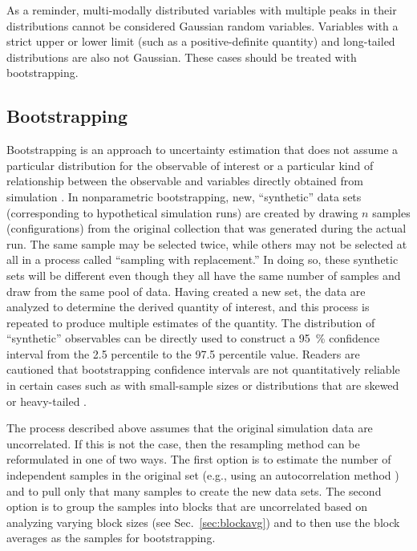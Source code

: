 As a reminder, multi-modally distributed variables with multiple peaks in their distributions cannot be considered Gaussian random variables.  Variables with a strict upper or lower limit (such as a positive-definite quantity) and long-tailed distributions are also not Gaussian.  These cases should be treated with bootstrapping.

\subsection{Bootstrapping}\label{sec:bootstrap}

Bootstrapping is an approach to uncertainty estimation that does not assume a particular distribution for the observable of interest or a particular kind of relationship between the observable and variables directly obtained from simulation \cite{Tibshirani1998}.  In nonparametric bootstrapping, new, ``synthetic'' data sets (corresponding to hypothetical simulation runs) are created by drawing $n$ samples (configurations) from the original collection that was generated during the actual run.  The same sample may be selected twice, while others may not be selected at all in a process called ``sampling with replacement.''  In doing so, these synthetic sets will be different even though they all have the same number of samples and draw from the same pool of data.  Having created a new set, the data are analyzed to determine the derived quantity of interest, and this process is repeated to produce multiple estimates of the quantity.  The distribution of ``synthetic'' observables can be directly used to construct a 95~\% confidence interval from the 2.5 percentile to the 97.5 percentile value.
Readers are cautioned that bootstrapping confidence intervals are not quantitatively reliable in certain cases such as with small-sample sizes or distributions that are skewed or heavy-tailed \cite{Schenker1985,Chernick2009}.

The process described above assumes that the original simulation data are uncorrelated.  If this is not the case, then the resampling method can be reformulated in one of two ways.  The first option is to estimate the number of independent samples in the original set (e.g., using an autocorrelation method \cite{Chodera-2016,Lyman2007a}) and to pull only that many samples to create the new data sets.  The second option is to group the samples into blocks that are uncorrelated based on analyzing varying block sizes (see Sec.~\ref{sec:blockavg}) and to then use the block averages as the samples for bootstrapping.


